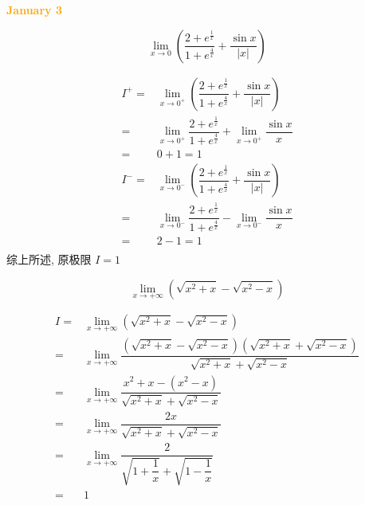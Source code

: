\textcolor{orange}{\textbf{January 3}}

\begin{example}[][Exam: 27.1.10]
	 $$\lim\limits_{x\to 0}\left(\dfrac{2+e^{\frac{1}{x}}}{1+e^{\frac{4}{x}}}+\dfrac{\sin x}{|x|}\right)$$
\end{example}

\begin{solution}

	\begin{align*}
		I^{+} = & \lim\limits_{x\to 0^{+}}\left(\dfrac{2+e^{\frac{1}{x}}}{1+e^{\frac{4}{x}}}+\dfrac{\sin x}{|x|}\right)\\
		      = & \lim\limits_{x\to 0^{+}}\dfrac{2+e^{\frac{1}{x}}}{1+e^{\frac{4}{x}}}+\lim\limits_{x\to 0^{+}}\dfrac{\sin x}{x}\\
			  = & 0+1 = 1\\
		I^{-} = & \lim\limits_{x\to 0^{-}}\left(\dfrac{2+e^{\frac{1}{x}}}{1+e^{\frac{4}{x}}}+\dfrac{\sin x}{|x|}\right)\\
			  = & \lim\limits_{x\to 0^{-}}\dfrac{2+e^{\frac{1}{x}}}{1+e^{\frac{4}{x}}}-\lim\limits_{x\to 0^{-}}\dfrac{\sin x}{x}\\
			  = & 2-1 = 1\\
	\end{align*}
	综上所述, 原极限 $I =1$
\end{solution}

\begin{example}[][Exam: 27.1.11]
	$$\lim\limits_{x\to+\infty}(\sqrt{x^{2}+x}-\sqrt{x^{2}-x})$$
\end{example}

\begin{solution}

	\begin{align*}
		I = & \lim\limits_{x\to+\infty}(\sqrt{x^{2}+x}-\sqrt{x^{2}-x})\\
		  = & \lim\limits_{x\to+\infty}\dfrac{(\sqrt{x^{2}+x}-\sqrt{x^{2}-x})(\sqrt{x^{2}+x}+\sqrt{x^{2}-x})}{\sqrt{x^{2}+x}+\sqrt{x^{2}-x}}\\
		  = & \lim\limits_{x\to+\infty}\dfrac{x^{2}+x-(x^{2}-x)}{\sqrt{x^{2}+x}+\sqrt{x^{2}-x}}\\
		  = & \lim\limits_{x\to+\infty}\dfrac{2x}{\sqrt{x^{2}+x}+\sqrt{x^{2}-x}}\\
		  = & \lim\limits_{x\to+\infty}\dfrac{2}{\sqrt{1+\dfrac{1}{x}}+\sqrt{1-\dfrac{1}{x}}}\\
		  = & 1
	\end{align*}
\end{solution}

